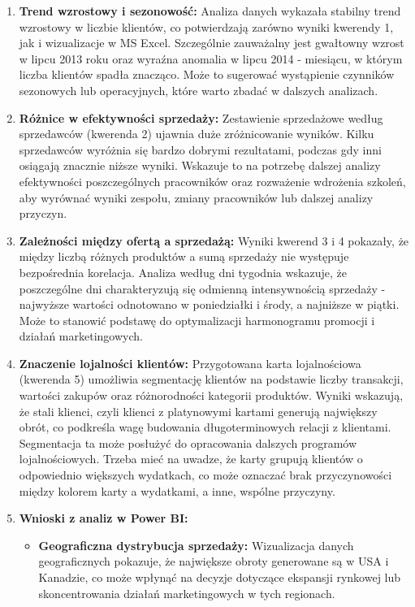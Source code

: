 \documentclass[a4paper,12pt]{article}
\begin{document}
\begin{enumerate}
    \item \textbf{Trend wzrostowy i sezonowość:}
          Analiza danych wykazała stabilny trend wzrostowy w liczbie klientów, co potwierdzają zarówno wyniki kwerendy 1, jak i wizualizacje w MS Excel. Szczególnie zauważalny jest gwałtowny wzrost w lipcu 2013 roku oraz wyraźna anomalia w lipcu 2014 - miesiącu, w którym liczba klientów spadła znacząco. Może to sugerować wystąpienie czynników sezonowych lub operacyjnych, które warto zbadać w dalszych analizach.

    \item \textbf{Różnice w efektywności sprzedaży:}
          Zestawienie sprzedażowe według sprzedawców (kwerenda 2) ujawnia duże zróżnicowanie wyników. Kilku sprzedawców wyróżnia się bardzo dobrymi rezultatami, podczas gdy inni osiągają znacznie niższe wyniki. Wskazuje to na potrzebę dalszej analizy efektywności poszczególnych pracowników oraz rozważenie wdrożenia szkoleń, aby wyrównać wyniki zespołu, zmiany pracowników lub dalszej analizy przyczyn.

    \item \textbf{Zależności między ofertą a sprzedażą:}
          Wyniki kwerend 3 i 4 pokazały, że między liczbą różnych produktów a sumą sprzedaży nie występuje bezpośrednia korelacja. Analiza według dni tygodnia wskazuje, że poszczególne dni charakteryzują się odmienną intensywnością sprzedaży - najwyższe wartości odnotowano w poniedziałki i środy, a najniższe w piątki. Może to stanowić podstawę do optymalizacji harmonogramu promocji i działań marketingowych.

    \item \textbf{Znaczenie lojalności klientów:}
          Przygotowana karta lojalnościowa (kwerenda 5) umożliwia segmentację klientów na podstawie liczby transakcji, wartości zakupów oraz różnorodności kategorii produktów. Wyniki wskazują, że stali klienci, czyli klienci z platynowymi kartami generują największy obrót, co podkreśla wagę budowania długoterminowych relacji z klientami. Segmentacja ta może posłużyć do opracowania dalszych programów lojalnościowych. Trzeba mieć na uwadze, że karty grupują klientów o odpowiednio większych wydatkach, co może oznaczać brak przyczynowości między kolorem karty a wydatkami, a inne, wspólne przyczyny.

    \item \textbf{Wnioski z analiz w Power BI:}
          \begin{itemize}
              \item \textbf{Geograficzna dystrybucja sprzedaży:}
                    Wizualizacja danych geograficznych pokazuje, że największe obroty generowane są w USA i Kanadzie, co może wpłynąć na decyzje dotyczące ekspansji rynkowej lub skoncentrowania działań marketingowych w tych regionach.


\end{itemize}
\end{enumerate}
\end{document}
